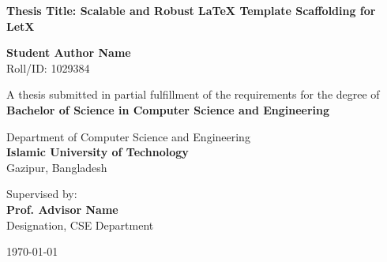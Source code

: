 \begin{titlepage}
\begin{center}
    \vspace*{1cm}
    
    
    \vspace{1.5cm}
    
    {\huge \bfseries \color{primary} Thesis Title: Scalable and Robust LaTeX Template Scaffolding for LetX}
    
    \vspace{1.5cm}
    
    {\Large \bfseries Student Author Name} \\
    \vspace{0.2cm}
    {Roll/ID: 1029384}
    
    \vspace{1.5cm}
    
    {A thesis submitted in partial fulfillment of the requirements for the degree of} \\
    \vspace{0.3cm}
    {\large \bfseries \color{secondary} Bachelor of Science in Computer Science and Engineering}
    
    \vspace{1.5cm}
    
    {Department of Computer Science and Engineering} \\
    \vspace{0.2cm}
    {\large \bfseries \color{primary} Islamic University of Technology} \\
    \vspace{0.1cm}
    {Gazipur, Bangladesh}
    
    \vfill
    
    {Supervised by:} \\
    {\large \bfseries Prof. Advisor Name} \\
    {Designation, CSE Department}
    
    \vspace{1cm}
    
    {\large \today}
    
\end{center}
\end{titlepage}
